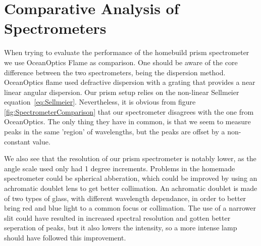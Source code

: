 \section{Comparative Analysis of Spectrometers}
When trying to evaluate the performance of the homebuild prism spectrometer we use OceanOptics Flame\autocite{OcOptFlameManual2016} as comparison. 
One should be aware of the core difference between the two spectrometers, being the dispersion method. 
OceanOptics flame used defractive dispersion with a grating\autocite{PaschottaDiffractionGratings} that provides a near linear angular dispersion. 
Our prism setup relies on the non-linear Sellmeier equation~\eqref{eq:Sellmeier}.
Nevertheless, it is obvious from figure \ref{fig:SpectrometerComparison} that our spectrometer disagrees with the one from OceanOptics.
The only thing they have in common, is that we seem to measure peaks in the same 'region' of wavelengths, but the peaks are offset by a non-constant value.

We also see that the resolution of our prism spectrometer is notably lower, as the angle scale used only had 1 degree increments.
Problems in the homemade spectrometer could be spherical abberation\autocite{PaschottaChromaticAberrations}, 
which could be improved by using an achromatic doublet lens to get better collimation. 
An achromatic doublet is made of two types of glass, with different wavelength dependance, in order to better bring red and blue light to a common focus or collimation. 
The use of a narrower slit could have resulted in increased spectral resolution\autocite{PaschottaSpectrometers} and gotten better seperation of peaks, 
but it also lowers the intensity, 
so a more intense lamp should have followed this improvement. 

